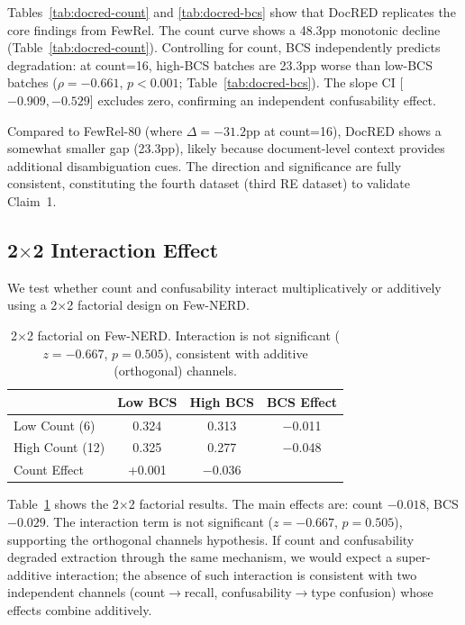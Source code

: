 \documentclass[11pt,a4paper]{article}
\begin{document}
Tables~\ref{tab:docred-count} and \ref{tab:docred-bcs} show that DocRED replicates the core findings from FewRel.
The count curve shows a 48.3pp monotonic decline (Table~\ref{tab:docred-count}).
Controlling for count, BCS independently predicts degradation: at count=16, high-BCS batches are 23.3pp worse than low-BCS batches ($\rho{=}{-}0.661$, $p{<}0.001$; Table~\ref{tab:docred-bcs}).
The slope CI [$-0.909, -0.529$] excludes zero, confirming an independent confusability effect.

Compared to FewRel-80 (where $\Delta{=}{-}31.2$pp at count=16), DocRED shows a somewhat smaller gap (23.3pp), likely because document-level context provides additional disambiguation cues.
The direction and significance are fully consistent, constituting the fourth dataset (third RE dataset) to validate Claim~1.

\subsection{2$\times$2 Interaction Effect}
\label{sec:interaction}

We test whether count and confusability interact multiplicatively or additively using a 2$\times$2 factorial design on Few-NERD.

\begin{table}[t]
\centering
\small
\begin{tabular}{lccc}
\toprule
 & \textbf{Low BCS} & \textbf{High BCS} & \textbf{BCS Effect} \\
\midrule
Low Count (6)  & 0.324 & 0.313 & $-$0.011 \\
High Count (12) & 0.325 & 0.277 & $-$0.048 \\
\midrule
Count Effect & +0.001 & $-$0.036 & \\
\bottomrule
\end{tabular}
\caption{2$\times$2 factorial on Few-NERD. Interaction is not significant ($z{=}{-}0.667$, $p{=}0.505$), consistent with additive (orthogonal) channels.}
\label{tab:2x2}
\end{table}

Table~\ref{tab:2x2} shows the 2$\times$2 factorial results.
The main effects are: count $-0.018$, BCS $-0.029$.
The interaction term is not significant ($z{=}{-}0.667$, $p{=}0.505$), supporting the orthogonal channels hypothesis.
If count and confusability degraded extraction through the same mechanism, we would expect a super-additive interaction; the absence of such interaction is consistent with two independent channels (count$\to$recall, confusability$\to$type confusion) whose effects combine additively.
\end{document}
